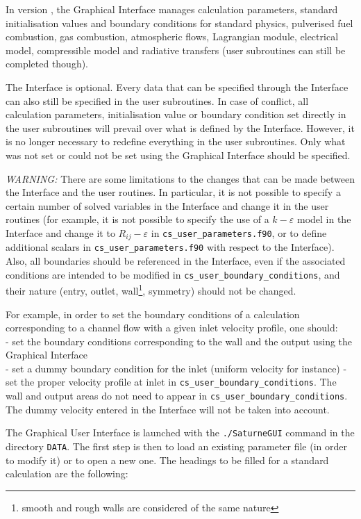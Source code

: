 {{{In version \verscs, the Graphical Interface manages calculation parameters,
standard initialisation values and boundary
conditions for standard physics, pulverised fuel combustion, gas combustion,
atmospheric flows, Lagrangian module,  electrical model, compressible model and radiative
transfers (user subroutines can still be completed though).

The Interface is optional. Every data that can be specified through the
Interface can also still be specified in the user subroutines. In case of
conflict, all calculation parameters, initialisation value or boundary condition
set directly in the user subroutines will prevail over what is defined by the
Interface. However, it is no longer necessary to redefine everything in the
user subroutines. Only what was not set or could not be set using the Graphical
Interface should be specified.

{\em WARNING: }
There are some limitations to the changes that can be made between the Interface
and the user routines. In particular, it is not possible to specify a certain
number of solved variables in the Interface and change it in the user routines
(for example, it is not possible to specify the use of a $k-\varepsilon$ model
in the Interface and change it to $R_{ij}-\varepsilon$ in \texttt{cs\_user\_parameters.f90}, or
to define additional scalars in \texttt{cs\_user\_parameters.f90} with respect to the
Interface). Also, all boundaries should be referenced in the Interface, even if
the associated conditions are intended to be modified in \texttt{cs\_user\_boundary\_conditions}, and
their nature (entry, outlet, wall\footnote{smooth and rough walls are considered
of the same nature}, symmetry) should not be changed.

For example, in order to set the boundary conditions of a calculation
corresponding to a channel flow with a given inlet velocity profile, one
should:\\
- set the boundary conditions corresponding to the wall and the output
using the Graphical Interface\\
- set a dummy boundary condition for the inlet (uniform velocity for instance)
- set the proper velocity profile at inlet in \texttt{cs\_user\_boundary\_conditions}. The wall and
output areas do not need to appear in \texttt{cs\_user\_boundary\_conditions}. The dummy velocity
entered in the Interface will not be taken into account.

The Graphical User Interface is launched with the \texttt{./SaturneGUI} command
in the directory \texttt{DATA}. The first step is
then to load an existing parameter file (in order to modify it) or to
open a new one. The headings to be filled for a standard calculation are the
following:

}}}
